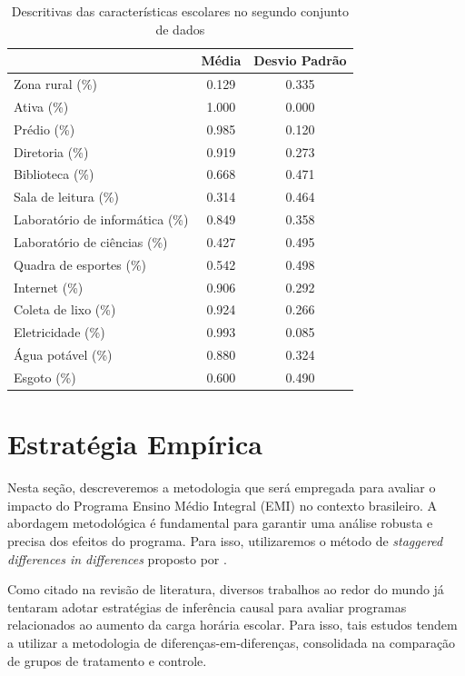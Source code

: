   \begin{table}[H]
    \centering
    \caption{Descritivas das características escolares no segundo conjunto de dados}
    \label{tab:desc_censo}
    \begin{tabular}{lcc}
    & Média& Desvio Padrão \\
    \hline
    Zona rural (\%) & 0.129 & 0.335 \\
    Ativa (\%) & 1.000 & 0.000 \\
    Prédio (\%) & 0.985 & 0.120 \\
    Diretoria (\%) & 0.919 & 0.273 \\
    Biblioteca (\%) & 0.668 & 0.471 \\
    Sala de leitura (\%) & 0.314 & 0.464 \\
    Laboratório de informática (\%) & 0.849 & 0.358 \\
    Laboratório de ciências (\%) & 0.427 & 0.495 \\
    Quadra de esportes (\%) & 0.542 & 0.498 \\
    Internet (\%) & 0.906 & 0.292 \\    
    Coleta de lixo (\%) & 0.924 & 0.266 \\
    Eletricidade (\%) & 0.993 & 0.085 \\
    Água potável (\%) & 0.880 & 0.324 \\
    Esgoto (\%) & 0.600 & 0.490 \\
    \hline
  \end{tabular}
    \end{table}
\chapter{Estratégia Empírica} \label{ecomometria}

Nesta seção, descreveremos a metodologia que será empregada para avaliar o impacto do Programa Ensino Médio Integral (EMI) no contexto brasileiro. A abordagem metodológica é fundamental para garantir uma análise robusta e precisa dos efeitos do programa. Para isso, utilizaremos o método de \textit{staggered differences in differences} proposto por \cite{CB_2021}.

Como citado na revisão de literatura, diversos trabalhos ao redor do mundo já tentaram adotar estratégias de inferência causal para avaliar programas relacionados ao aumento da carga horária escolar. Para isso, tais estudos tendem a utilizar a metodologia de diferenças-em-diferenças, consolidada na comparação de grupos de tratamento e controle.


